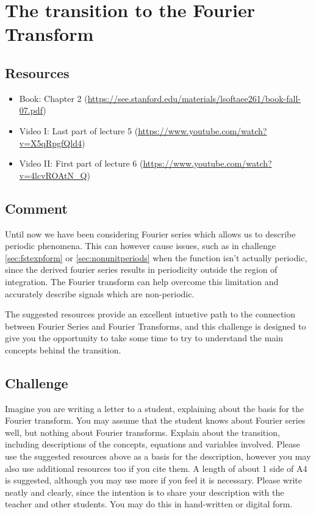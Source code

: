 \newpage
\section{The transition to the Fourier Transform}

\subsection*{Resources}
\begin{itemize}
    \item Book: Chapter 2 (\url{https://see.stanford.edu/materials/lsoftaee261/book-fall-07.pdf})
    \item Video I: Last part of lecture 5 (\url{https://www.youtube.com/watch?v=X5qRpgfQld4})
    \item Video II: First part of lecture 6 (\url{https://www.youtube.com/watch?v=4lcvROAtN_Q})
\end{itemize}

\subsection*{Comment}
Until now we have been considering Fourier series which allows us to describe periodic phenomena. This can however cause issues, such as in challenge \ref{sec:fstexpform} or \ref{sec:nonunitperiods} when the function isn't actually periodic, since the derived fourier series results in periodicity outside the region of integration. The Fourier transform can help overcome this limitation and accurately describe signals which are non-periodic.

The suggested resources provide an excellent intuetive path to the connection between Fourier Series and Fourier Transforms, and this challenge is designed to give you the opportunity to take some time to try to understand the main concepts behind the transition.

\subsection*{Challenge}
Imagine you are writing a letter to a student, explaining about the basis for the Fourier transform. You may assume that the student knows about Fourier series well, but nothing about Fourier transforms. Explain about the transition, including descriptions of the concepts, equations and variables involved. Please use the suggested resources above as a basis for the description, however you may also use additional resources too if you cite them. A length of about 1 side of A4 is suggested, although you may use more if you feel it is necessary. Please write neatly and clearly, since the intention is to share your description with the teacher and other students. You may do this in hand-written or digital form.

